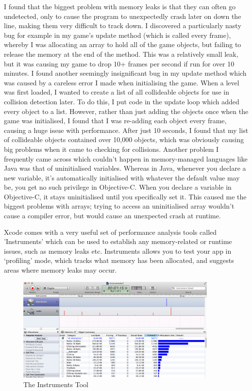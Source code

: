 \documentclass[a4paper,oneside]{report}
\begin{document}
I found that the biggest problem with memory leaks is that they can often go undetected, only to cause the program to unexpectedly crash later on down the line, making them very difficult to track down. I discovered a particularly nasty bug for example in my game's update method (which is called every frame), whereby I was allocating an array to hold all of the game objects, but failing to release the memory at the end of the method. This was a relatively small leak, but it was causing my game to drop 10+ frames per second if run for over 10 minutes. I found another seemingly insignificant bug in my update method which was caused by a careless error I made when initialising the game. When a level was first loaded, I wanted to create a list of all collideable objects for use in collision detection later. To do this, I put code in the update loop which added every object to a list. However, rather than just adding the objects once when the game was initialised, I found that I was re-adding each object every frame, causing a huge issue with performance. After just 10 seconds, I found that my list of collideable objects contained over 10,000 objects, which was obviously causing big problems when it came to checking for collisions. Another problem I frequently came across which couldn't happen in memory-managed languages like Java was that of uninitialised variables. Whereas in Java, whenever you declare a new variable, it's automatically initialised with whatever the default value may be, you get no such privilege in Objective-C. When you declare a variable in Objective-C, it stays uninitialised until you specifically set it. This caused me the biggest problems with arrays; trying to access an uninitialised array wouldn't cause a compiler error, but would cause an unexpected crash at runtime.

Xcode comes with a very useful set of performance analysis tools called 'Instruments' which can be used to establish any memory-related or runtime issues, such as memory leaks etc. Instruments allows you to test your app in `profiling' mode, which tracks what memory has been allocated, and suggests areas where memory leaks may occur.

\begin{figure}[h!]
  \centering
    \includegraphics[width=100mm]{sources/images/Instruments}
    \caption{The Instruments Tool}
    \label{fig:TextureAtlas}
\end{figure}
\end{document}
